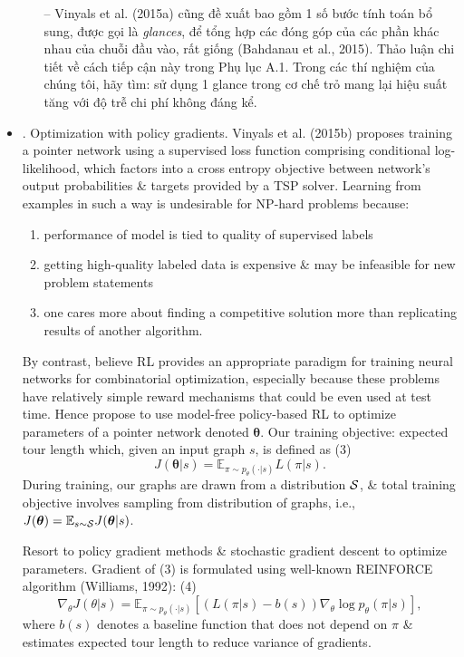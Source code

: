 \documentclass{article}
\begin{document}
\begin{itemize}
\begin{itemize}
        -- Vinyals et al. (2015a) cũng đề xuất bao gồm 1 số bước tính toán bổ sung, được gọi là {\it glances}, để tổng hợp các đóng góp của các phần khác nhau của chuỗi đầu vào, rất giống (Bahdanau et al., 2015). Thảo luận chi tiết về cách tiếp cận này trong Phụ lục A.1. Trong các thí nghiệm của chúng tôi, hãy tìm: sử dụng 1 glance trong cơ chế trỏ mang lại hiệu suất tăng với độ trễ chi phí không đáng kể.
    \end{itemize}
    \item {. Optimization with policy gradients.} Vinyals et al. (2015b) proposes training a pointer network using a supervised loss function comprising conditional log-likelihood, which factors into a cross entropy objective between network's output probabilities \& targets provided by a TSP solver. Learning from examples in such a way is undesirable for NP-hard problems because:
    \begin{enumerate}
        \item performance of model is tied to quality of supervised labels
        \item getting high-quality labeled data is expensive \& may be infeasible for new problem statements
        \item one cares more about finding a competitive solution more than replicating results of another algorithm.
    \end{enumerate}
    By contrast, believe RL provides an appropriate paradigm for training neural networks for combinatorial optimization, especially because these problems have relatively simple reward mechanisms that could be even used at test time. Hence propose to use model-free policy-based RL to optimize parameters of a pointer network denoted $\boldsymbol{\theta}$. Our training objective: expected tour length which, given an input graph $s$, is defined as (3)
    \begin{equation*}
        J(\boldsymbol{\theta}|s) = \mathbb{E}_{\pi\sim p_\theta(\cdot|s)} L(\pi|s).
    \end{equation*}
    During training, our graphs are drawn from a distribution ${\cal S}$, \& total training objective involves sampling from distribution of graphs, i.e., $J(\boldsymbol{\theta}) = \mathbb{E}_{s\sim{\cal S}} J(\boldsymbol{\theta}|s)$.
    
    Resort to policy gradient methods \& stochastic gradient descent to optimize parameters. Gradient of (3) is formulated using well-known REINFORCE algorithm (Williams, 1992): (4)
    \begin{equation*}
        \nabla_\theta J(\theta|s) = \mathbb{E}_{\pi\sim p_\theta(\cdot|s)}\left[(L(\pi|s) - b(s))\nabla_\theta\log p_\theta(\pi|s)\right],
    \end{equation*}
    where $b(s)$ denotes a baseline function that does not depend on $\pi$ \& estimates expected tour length to reduce variance of gradients.
    

\end{itemize}
\end{document}
